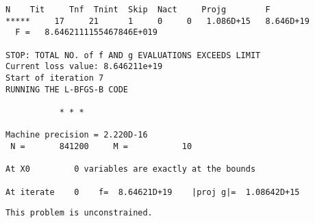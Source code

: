 \documentclass[11pt]{article}
\begin{document}
\begin{Verbatim}[commandchars=\\\{\}]
   N    Tit     Tnf  Tnint  Skip  Nact     Projg        F
*****     17     21      1     0     0   1.086D+15   8.646D+19
  F =   8.6462111155467846E+019

STOP: TOTAL NO. of f AND g EVALUATIONS EXCEEDS LIMIT
Current loss value: 8.646211e+19
Start of iteration 7
RUNNING THE L-BFGS-B CODE

           * * *

Machine precision = 2.220D-16
 N =       841200     M =           10

At X0         0 variables are exactly at the bounds

At iterate    0    f=  8.64621D+19    |proj g|=  1.08642D+15
    \end{Verbatim}

    \begin{Verbatim}[commandchars=\\\{\}]
 This problem is unconstrained.
    \end{Verbatim}
\end{document}
